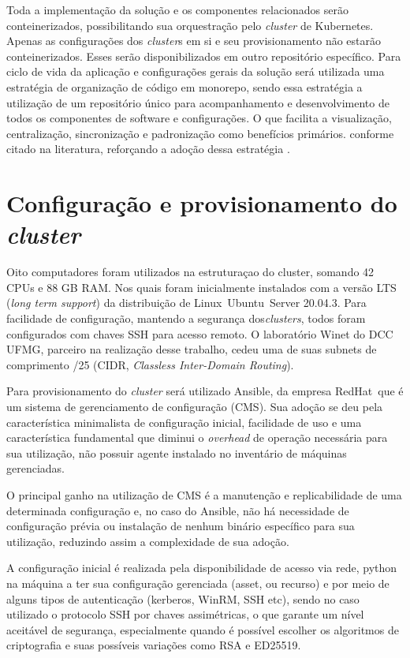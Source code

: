 Toda a implementação da solução e os componentes relacionados serão conteinerizados, possibilitando  sua orquestração pelo  \emph{cluster} de Kubernetes\textregistered. Apenas as configurações dos  \emph{cluster}s em si e seu provisionamento não estarão conteinerizados. Esses serão disponibilizados em outro repositório específico. 
Para ciclo de vida da aplicação e configurações gerais da solução será utilizada uma estratégia de organização de código em monorepo, sendo essa estratégia a utilização de um repositório único para acompanhamento e desenvolvimento de todos os componentes de software e configurações. O que facilita a visualização, centralização, sincronização e padronização como benefícios primários. conforme citado na literatura, reforçando a adoção dessa estratégia \cite{brito_monorepos_2018}.


\section{Configuração e provisionamento do  \emph{cluster}}

Oito computadores foram utilizados na estruturaçao do cluster, somando 42 CPUs e 88 GB RAM. Nos quais foram inicialmente instalados com a versão LTS (\emph{long term support}) da distribuição de Linux\textregistered \ Ubuntu\textregistered \ Server {20.04.3}. Para facilidade de configuração, mantendo a segurança dos\emph{clusters}, todos foram configurados com chaves SSH para acesso remoto. O laboratório Winet do DCC UFMG, parceiro na realização desse trabalho, cedeu uma de suas subnets de comprimento /25 (CIDR, \emph{Classless Inter-Domain Routing}). 

Para provisionamento do \emph{cluster} será utilizado Ansible\textregistered, da empresa RedHat\textregistered \ que é  um sistema de gerenciamento de configuração (CMS). Sua adoção se deu pela característica minimalista de configuração inicial, facilidade de uso e uma característica fundamental que diminui o \emph{overhead} de operação necessária para sua utilização, não possuir agente instalado no inventário de máquinas gerenciadas. 

O principal ganho na utilização de CMS é a manutenção e replicabilidade de uma determinada configuração e, no caso do Ansible, não há necessidade de configuração prévia ou instalação de nenhum binário específico para sua utilização, reduzindo assim a complexidade de sua adoção.

A configuração inicial é realizada pela disponibilidade de acesso via rede, python na máquina a ter sua configuração gerenciada (asset, ou recurso) e por meio de alguns tipos de autenticação (kerberos, WinRM, SSH etc), sendo no caso utilizado o protocolo SSH \cite{noauthor_rfc4254_nodate} por chaves assimétricas, o que garante um nível aceitável de segurança, especialmente quando é possível escolher os algoritmos de criptografia e suas possíveis variações como RSA e ED25519.

